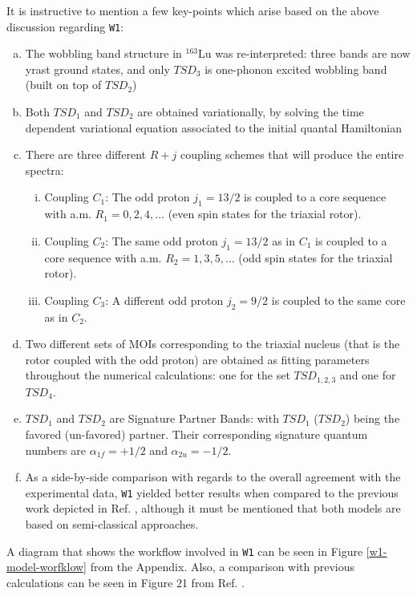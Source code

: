 \documentclass[11pt]{article}
\begin{document}
It is instructive to mention a few key-points which arise based on the above discussion regarding \texttt{W1}:

\begin{enumerate}[(a)]
    \item The wobbling band structure in $^{163}$Lu was re-interpreted: three bands are now yrast ground states, and only $TSD_3$ is one-phonon excited wobbling band (built on top of $TSD_2$)
    \item Both $TSD_1$ and $TSD_2$ are obtained variationally, by solving the time dependent variational equation associated to the initial quantal Hamiltonian
    \item There are three different $R+j$ coupling schemes that will produce the entire spectra:
    \begin{enumerate}[(i)]
        \item Coupling $C_1$: The odd proton $j_1={13/2}$ is coupled to a core sequence with a.m. $R_1=0,2,4,\dots$ (even spin states for the triaxial rotor).
        \item Coupling $C_2$: The same odd proton $j_1={13/2}$ as in $C_1$ is coupled to a core sequence with a.m. $R_2=1,3,5,\dots$ (odd spin states for the triaxial rotor).
        \item Coupling $C_3$: A different odd proton $j_2={9/2}$ is coupled to the same core as in $C_2$.
    \end{enumerate}
    \item Two different sets of MOIs corresponding to the triaxial nucleus (that is the rotor coupled with the odd proton) are obtained as fitting parameters throughout the numerical calculations: one for the set $TSD_{1,2,3}$ and one for $TSD_4$.
    \item $TSD_1$ and $TSD_2$ are Signature Partner Bands: with $TSD_1$ ($TSD_2$) being the favored (un-favored) partner. Their corresponding signature quantum numbers are $\alpha_{1f}=+1/2$ and $\alpha_{2u}=-1/2$.
    \item As a side-by-side comparison with regards to the overall agreement with the experimental data, \texttt{W1} yielded better results when compared to the previous work depicted in Ref. \cite{raduta2007semiclassical}, although it must be mentioned that both models are based on semi-classical approaches.
\end{enumerate}

A diagram that shows the workflow involved in \texttt{W1} can be seen in Figure \ref{w1-model-worfklow} from the Appendix. Also, a comparison with previous calculations can be seen in Figure 21 from Ref. \cite{raduta2020approach}.
\end{document}
